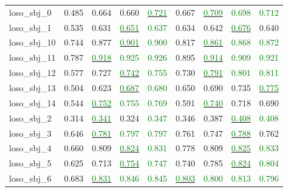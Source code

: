 \begin{table}[t]
\begin{tabularx}{\linewidth}{@{}>{\raggedright\arraybackslash}X cccc @{\hspace{1.5em}} cccc@{}}
    loso_sbj_0 & 0.485 & 0.664 & 0.660 & \underline{\textcolor{green}{0.721}} & 0.667 & \underline{\textcolor{green}{0.709}} & \textcolor{green}{0.698} & \textcolor{green}{0.712} \\
    loso_sbj_1 & 0.535 & 0.631 & \underline{\textcolor{green}{0.651}} & \textcolor{green}{0.637} & 0.634 & 0.642 & \underline{\textcolor{green}{0.676}} & 0.640 \\
    loso_sbj_10 & 0.744 & 0.877 & \underline{\textcolor{green}{0.901}} & \textcolor{green}{0.900} & 0.817 & \underline{\textcolor{green}{0.861}} & \textcolor{green}{0.868} & \textcolor{green}{0.872} \\
    loso_sbj_11 & 0.787 & \underline{\textcolor{green}{0.918}} & \textcolor{green}{0.925} & \textcolor{green}{0.926} & 0.895 & \underline{\textcolor{green}{0.914}} & \textcolor{green}{0.909} & \textcolor{green}{0.921} \\
    loso_sbj_12 & 0.577 & 0.727 & \underline{\textcolor{green}{0.742}} & \textcolor{green}{0.755} & 0.730 & \underline{\textcolor{green}{0.791}} & \textcolor{green}{0.801} & \textcolor{green}{0.811} \\
    loso_sbj_13 & 0.504 & 0.623 & \underline{\textcolor{green}{0.687}} & \textcolor{green}{0.680} & 0.650 & 0.690 & 0.735 & \underline{\textcolor{green}{0.775}} \\
    loso_sbj_14 & 0.544 & \underline{\textcolor{green}{0.752}} & \textcolor{green}{0.755} & \textcolor{green}{0.769} & 0.591 & \underline{\textcolor{green}{0.740}} & 0.718 & 0.690 \\
    loso_sbj_2 & 0.314 & \underline{\textcolor{green}{0.341}} & 0.324 & \textcolor{green}{0.347} & 0.346 & 0.387 & \underline{\textcolor{green}{0.408}} & \textcolor{green}{0.408} \\
    loso_sbj_3 & 0.646 & \underline{\textcolor{green}{0.781}} & \textcolor{green}{0.797} & \textcolor{green}{0.797} & 0.761 & 0.747 & \underline{\textcolor{green}{0.788}} & 0.762 \\
    loso_sbj_4 & 0.660 & 0.809 & \underline{\textcolor{green}{0.824}} & \textcolor{green}{0.831} & 0.778 & 0.809 & \underline{\textcolor{green}{0.825}} & \textcolor{green}{0.833} \\
    loso_sbj_5 & 0.625 & 0.713 & \underline{\textcolor{green}{0.754}} & \textcolor{green}{0.747} & 0.740 & 0.785 & \underline{\textcolor{green}{0.824}} & \textcolor{green}{0.804} \\
    loso_sbj_6 & 0.683 & \underline{\textcolor{green}{0.831}} & \textcolor{green}{0.846} & \textcolor{green}{0.845} & \underline{\textcolor{green}{0.803}} & \textcolor{green}{0.800} & \textcolor{green}{0.813} & \textcolor{green}{0.796} \\

\end{tabularx}
\end{table}
